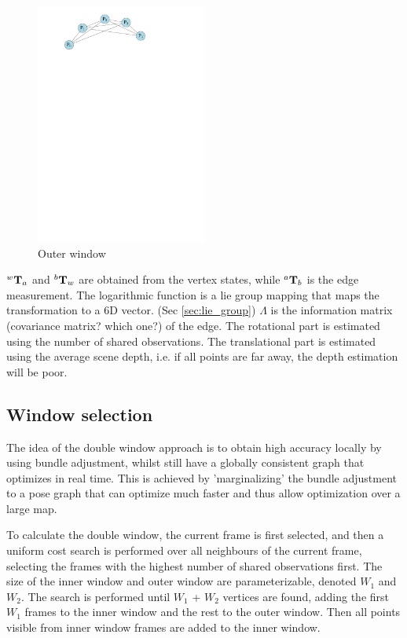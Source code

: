\begin{figure}[h!]
  \centering
    \includegraphics[width=0.5\textwidth]{chapters/images/outer_window}
  \caption{Outer window}
  \label{fig:outer_window}
\end{figure}

$^{w}\mathbf T_{a}$ and $^{b} \mathbf T_{w}$ are obtained from the vertex states, while $^{a} \mathbf T_{b}$ is the edge measurement.  The logarithmic function is a lie group mapping that maps the transformation to a 6D vector. (Sec \ref{sec:lie_group})  $\Lambda$ is the information matrix (covariance matrix? which one?) of the edge.  The rotational part is estimated using the number of shared observations.  The translational part is estimated using the average scene depth, i.e. if all points are far away, the depth estimation will be poor.

\subsection{Window selection}

The idea of the double window approach is to obtain high accuracy locally by using bundle adjustment, whilst still have a globally consistent graph that optimizes in real time.  This is achieved by 'marginalizing' the bundle adjustment to a pose graph that can optimize much faster and thus allow optimization over a large map.

To calculate the double window, the current frame is first selected, and then a uniform cost search is performed over all neighbours of the current frame, selecting the frames with the highest number of shared observations first. The size of the inner window and outer window are parameterizable, denoted $W_1$ and $W_2$. The search is performed until $W_1$ + $W_2$ vertices are found, adding the first $W_1$ frames to the inner window and the rest to the outer window. Then all points visible from inner window frames are added to the inner window.  


